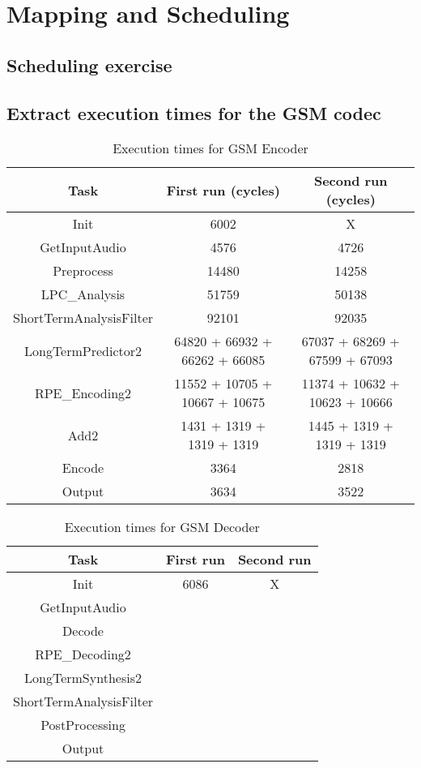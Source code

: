 \documentclass[a4paper, 12pt]{article}
\begin{document}
\section{Mapping and Scheduling}
\subsection{Scheduling exercise}
\subsection{Extract execution times for the GSM codec}

\begin{table}[h]
  \centering
  \begin{tabular}{c c c}
    \hline
    Task & First run (cycles) & Second run (cycles) \\
    \hline
    Init & 6002  & X \\
    GetInputAudio & 4576  & 4726 \\
    Preprocess & 14480  & 14258  \\
    LPC\_Analysis & 51759  & 50138 \\
    ShortTermAnalysisFilter & 92101 & 92035 \\
    LongTermPredictor2 & 64820 + 66932 + 66262 + 66085 & 67037 + 68269 + 67599 + 67093 \\
    RPE\_Encoding2 & 11552 + 10705 + 10667 + 10675 & 11374 + 10632 + 10623 + 10666\\
    Add2 & 1431 + 1319 + 1319 + 1319 & 1445 + 1319 + 1319 + 1319\\
    Encode & 3364 & 2818 \\
    Output & 3634 & 3522 \\
  \end{tabular}
  \caption{Execution times for GSM Encoder}
\end{table}


\begin{table}[h]
  \centering
  \begin{tabular}{c c c}
    \hline
    Task & First run & Second run \\
    \hline
    Init & 6086 & X \\
    GetInputAudio & & \\
    Decode & & \\
    RPE\_Decoding2 & & \\
    LongTermSynthesis2 & & \\
    ShortTermAnalysisFilter & & \\
    PostProcessing & & \\
    Output & & \\
  \end{tabular}
  \caption{Execution times for GSM Decoder}
\end{table}
\end{document}
